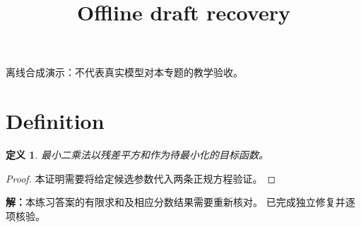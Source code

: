\documentclass[UTF8,fontset=fandol,11pt]{ctexart}
\title{Offline draft recovery}
\date{}
\newtheorem{definition}{定义}[section]
\begin{document}
\maketitle
\par\noindent 离线合成演示：不代表真实模型对本专题的教学验收。\par
\section{Definition}\label{sec:S01}
\begin{definition}
最小二乘法以残差平方和作为待最小化的目标函数。
\end{definition}
\begin{proof}
本证明需要将给定候选参数代入两条正规方程验证。
\end{proof}
\par\noindent\textbf{解：}本练习答案的有限求和及相应分数结果需要重新核对。 已完成独立修复并逐项核验。\par
\end{document}
